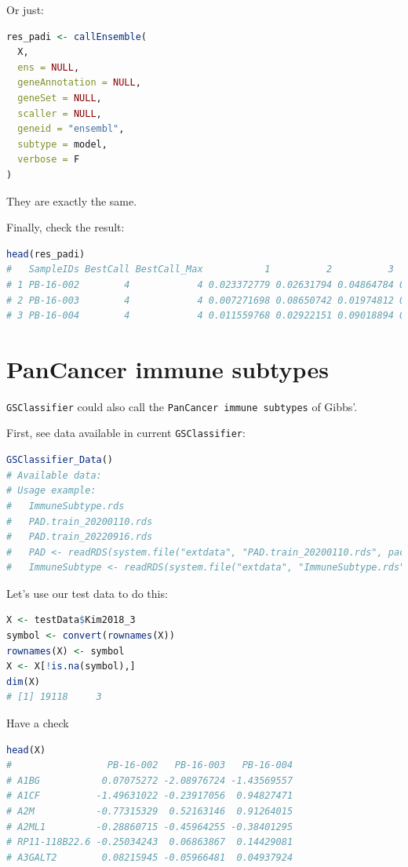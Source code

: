 \documentclass[
  12pt,
]{book}
\newcommand{\passthrough}[1]{#1}
\begin{document}
Or just:

\begin{lstlisting}[language=R]
res_padi <- callEnsemble(
  X,
  ens = NULL,
  geneAnnotation = NULL,
  geneSet = NULL,
  scaller = NULL,
  geneid = "ensembl",
  subtype = model, 
  verbose = F
)
\end{lstlisting}

They are exactly the same.

Finally, check the result:

\begin{lstlisting}[language=R]
head(res_padi)
#   SampleIDs BestCall BestCall_Max           1          2          3         4
# 1 PB-16-002        4            4 0.023372779 0.02631794 0.04864784 0.3336484
# 2 PB-16-003        4            4 0.007271698 0.08650742 0.01974812 0.9530730
# 3 PB-16-004        4            4 0.011559768 0.02922151 0.09018894 0.8649045
\end{lstlisting}

\hypertarget{pancancer-immune-subtypes}{%
\section{PanCancer immune subtypes}\label{pancancer-immune-subtypes}}

\passthrough{\lstinline!GSClassifier!} could also call the \passthrough{\lstinline!PanCancer immune subtypes!} of Gibbs'.

First, see data available in current \passthrough{\lstinline!GSClassifier!}:

\begin{lstlisting}[language=R]
GSClassifier_Data()
# Available data:
# Usage example:
#   ImmuneSubtype.rds 
#   PAD.train_20200110.rds 
#   PAD.train_20220916.rds 
#   PAD <- readRDS(system.file("extdata", "PAD.train_20200110.rds", package = "GSClassifier")) 
#   ImmuneSubtype <- readRDS(system.file("extdata", "ImmuneSubtype.rds", package = "GSClassifier"))
\end{lstlisting}

Let's use our test data to do this:

\begin{lstlisting}[language=R]
X <- testData$Kim2018_3
symbol <- convert(rownames(X))
rownames(X) <- symbol
X <- X[!is.na(symbol),]
dim(X)
# [1] 19118     3
\end{lstlisting}

Have a check

\begin{lstlisting}[language=R]
head(X)
#                 PB-16-002   PB-16-003   PB-16-004
# A1BG           0.07075272 -2.08976724 -1.43569557
# A1CF          -1.49631022 -0.23917056  0.94827471
# A2M           -0.77315329  0.52163146  0.91264015
# A2ML1         -0.28860715 -0.45964255 -0.38401295
# RP11-118B22.6 -0.25034243  0.06863867  0.14429081
# A3GALT2        0.08215945 -0.05966481  0.04937924
\end{lstlisting}
\end{document}
